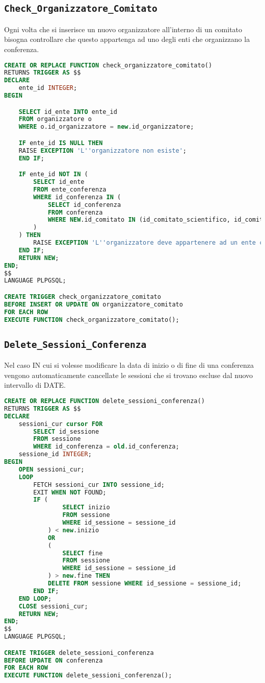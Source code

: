 \subsection{\texttt{Check\_Organizzatore\_Comitato}}
Ogni volta che si inserisce un nuovo organizzatore all'interno di un comitato bisogna controllare che questo appartenga ad uno degli enti che organizzano la conferenza.
\begin{lstlisting}[language=SQL, style=mystyle, caption={\texttt{Check\_organizzatori\_comitato}}]
CREATE OR REPLACE FUNCTION check_organizzatore_comitato() 
RETURNS TRIGGER AS $$
DECLARE
	ente_id INTEGER;
BEGIN

	SELECT id_ente INTO ente_id
	FROM organizzatore o
	WHERE o.id_organizzatore = new.id_organizzatore;

	IF ente_id IS NULL THEN
	RAISE EXCEPTION 'L''organizzatore non esiste';
	END IF;

	IF ente_id NOT IN (
		SELECT id_ente
		FROM ente_conferenza
		WHERE id_conferenza IN (
			SELECT id_conferenza
			FROM conferenza
			WHERE NEW.id_comitato IN (id_comitato_scientifico, id_comitato_locale)
		)
	) THEN
		RAISE EXCEPTION 'L''organizzatore deve appartenere ad un ente che ha organizzato la conferenza';
	END IF;
	RETURN NEW;
END;
$$ 
LANGUAGE PLPGSQL;

CREATE TRIGGER check_organizzatore_comitato
BEFORE INSERT OR UPDATE ON organizzatore_comitato
FOR EACH ROW
EXECUTE FUNCTION check_organizzatore_comitato();
\end{lstlisting}
\subsection{\texttt{Delete\_Sessioni\_Conferenza}}
Nel caso IN cui si volesse modificare la data di inizio o di fine di una conferenza vengono automaticamente cancellate le sessioni che si trovano escluse dal nuovo intervallo di DATE.
\begin{lstlisting}[language=SQL, style=mystyle, caption={\texttt{DELETE\_sessioni\_conferenza}}]
CREATE OR REPLACE FUNCTION delete_sessioni_conferenza() 
RETURNS TRIGGER AS $$
DECLARE
	sessioni_cur cursor FOR 
		SELECT id_sessione 
		FROM sessione 
		WHERE id_conferenza = old.id_conferenza;
	sessione_id INTEGER;
BEGIN
	OPEN sessioni_cur;
	LOOP
		FETCH sessioni_cur INTO sessione_id;
		EXIT WHEN NOT FOUND;
		IF (
				SELECT inizio 
				FROM sessione 
				WHERE id_sessione = sessione_id
			) < new.inizio
			OR
			(
				SELECT fine 
				FROM sessione 
				WHERE id_sessione = sessione_id
			) > new.fine THEN
			DELETE FROM sessione WHERE id_sessione = sessione_id;
		END IF;
	END LOOP;
	CLOSE sessioni_cur;
	RETURN NEW;
END;
$$ 
LANGUAGE PLPGSQL;

CREATE TRIGGER delete_sessioni_conferenza
BEFORE UPDATE ON conferenza
FOR EACH ROW
EXECUTE FUNCTION delete_sessioni_conferenza();
\end{lstlisting}
